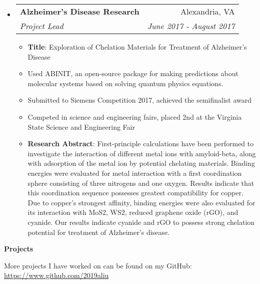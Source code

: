 \documentclass[letterpaper,11pt]{article}
\makeatletter
\newcommand{\resitem}[1]{\item #1 \vspace{-2pt}}
\newcommand{\resheading}[1]{{\large \colorbox{mygrey}{\begin{minipage}{\textwidth}{\textbf{#1 \vphantom{p\^{E}}}}\end{minipage}}}}
\newcommand{\ressubheading}[4]{
\begin{tabular*}{7.0in}{l@{\extracolsep{\fill}}r}
		\textbf{#1} & #2 \\
		\textit{#3} & \textit{#4} \\
\end{tabular*}\vspace{-6pt}}
\makeatother
\begin{document}
\begin{itemize}
\item
	\ressubheading{Alzheimer's Disease Research}{Alexandria, VA}{Project Lead}{June 2017 - August 2017}
	\begin{itemize}
	    \resitem{\textbf{Title}: Exploration of Chelation Materials for Treatment of Alzheimer's Disease}
		\resitem{Used ABINIT, an open-source package for making predictions about molecular systems based on solving quantum physics equations.}
		\resitem{Submitted to Siemens Competition 2017, achieved the semifinalist award}
		\resitem{Competed in science and engineering fairs, placed 2nd at the Virginia State Science and Engineering Fair}
		\resitem{\textbf{Research Abstract}: \scriptsize{First-principle calculations have been performed to investigate the interaction of different metal ions with amyloid-beta, along with adsorption of the metal ion by potential chelating materials. Binding energies were evaluated for metal interaction with a first coordination sphere consisting of three nitrogens and one oxygen. Results indicate that this coordination sequence possesses greatest compatibility for copper. Due to copper's strongest affinity, binding energies were also evaluated for its interaction with MoS2, WS2, reduced graphene oxide (rGO), and cyanide. Our results indicate cyanide and rGO to possess strong chelation potential for treatment of Alzheimer's disease.}}
	\end{itemize}
\end{itemize}


\resheading{Projects}

\vspace{1em}
More projects I have worked on can be found on my GitHub: \url{https://www.github.com/2019aliu}
\end{document}
